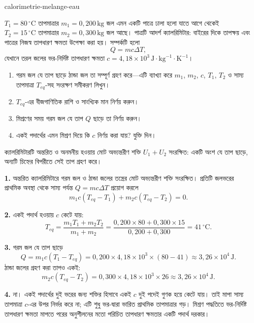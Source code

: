\begin{exo}[দুই ভরের জলের মিশ্রণ]{calorimetrie-melange-eau}

$T_1=80\,{}^\circ\text{C}$ তাপমাত্রার $m_1=0{,}200\,\text{kg}$ জল এমন একটি পাত্রে ঢালা হলো যাতে আগে থেকেই $T_2=15\,{}^\circ\text{C}$ তাপমাত্রার $m_2=0{,}300\,\text{kg}$ জল আছে। পাত্রটি আদর্শ ক্যালরিমিটার: বাইরের দিকে তাপক্ষয় এবং পাত্রের নিজস্ব তাপধারণ ক্ষমতা উপেক্ষা করা হয়। সম্পর্কটি হলো
\[
Q=mc\Delta T,
\]
যেখানে তরল জলের ভর-নির্দিষ্ট তাপধারণ ক্ষমতা $c=4{,}18\times10^3\,\text{J}\!\cdot\!\text{kg}^{-1}\!\cdot\!\text{K}^{-1}$।

\begin{enumerate}
  \item গরম জল যে তাপ ছাড়ে ঠান্ডা জল তা সম্পূর্ণ গ্রহণ করে—এটি ব্যাখ্যা করে $m_1$, $m_2$, $c$, $T_1$, $T_2$ ও সাম্য তাপমাত্রা $T_{eq}$-সহ সংরক্ষণ সমীকরণ লিখুন।
  \item $T_{eq}$-এর বীজগাণিতিক রাশি ও সাংখ্যিক মান নির্ণয় করুন।
  \item মিশ্রণের সময় গরম জল যে তাপ $Q$ ছাড়ে তা নির্ণয় করুন।
  \item একই পদার্থের এমন মিশ্রণ দিয়ে কি $c$ নির্ণয় করা যায়? যুক্তি দিন।
\end{enumerate}

\begin{indication}
ক্যালরিমিটারটি অন্তরিত ও অনমনীয় হওয়ায় মোট অভ্যন্তরীণ শক্তি $U_1+U_2$ সংরক্ষিত: একটি অংশ যে তাপ ছাড়ে, অন্যটি চিহ্নের বিপরীতে সেই তাপ গ্রহণ করে।
\end{indication}

\begin{solution}
\textbf{1.} অন্তরিত ক্যালরিমিটারে গরম জল ও ঠান্ডা জলের তন্ত্রের মোট অভ্যন্তরীণ শক্তি সংরক্ষিত। প্রতিটি জলভরের প্রাথমিক অবস্থা থেকে সাম্য পর্যন্ত $Q=mc\Delta T$ প্রয়োগ করলে
\[
m_1c(T_{eq}-T_1)+m_2c(T_{eq}-T_2)=0.
\]

\textbf{2.} একই পদার্থ হওয়ায় $c$ কেটে যায়:
\[
T_{eq}=\frac{m_1T_1+m_2T_2}{m_1+m_2}
=\frac{0{,}200\times80+0{,}300\times15}{0{,}200+0{,}300}
=41\,{}^\circ\text{C}.
\]

\textbf{3.} গরম জল যে তাপ ছাড়ে
\[
Q=m_1c(T_1-T_{eq})
=0{,}200\times4{,}18\times10^3\times(80-41)
\approx3{,}26\times10^4\,\text{J}.
\]
ঠান্ডা জলের গ্রহণ করা তাপও একই:
\[
m_2c(T_{eq}-T_2)=0{,}300\times4{,}18\times10^3\times26\approx3{,}26\times10^4\,\text{J}.
\]

\textbf{4.} না। একই পদার্থের দুই ভরের জন্য শক্তির হিসাবে একই $c$ দুই পদেই গুণক হয়ে কেটে যায়। তাই মাপা সাম্য তাপমাত্রা $c$-এর উপর নির্ভর করে না; এটি শুধু ভর-দ্বারা ভারিত প্রাথমিক তাপমাত্রার গড়। মিশ্রণ পদ্ধতিতে ভর-নির্দিষ্ট তাপধারণ ক্ষমতা মাপতে পরের অনুশীলনের মতো পরিচিত তাপধারণ ক্ষমতার একটি পদার্থ দরকার।
\end{solution}
\end{exo}

